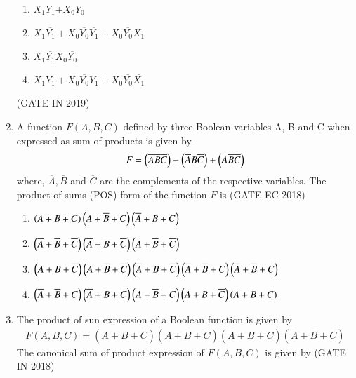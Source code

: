 \begin{enumerate}[label=\arabic*.,ref=\theenumi]
\begin{enumerate}
                        \item$X_1Y_1$+$X_0Y_0$
                        \item$X_1\overline{Y_1}+X_0\overline{Y_0}\overline{Y_1}+X_0\overline{Y_0}X_1$
                        \item$X_1\overline{Y_1}X_0\overline{Y_0}$
                        \item$X_1Y_1+X_0\overline{Y_0}Y_1+X_0\overline{Y_0}\overline{X_1}$
                  \end{enumerate}
            \hfill(GATE IN 2019)
%
\item
	\label{prob:2023-gate-ec-9}
	A function $F(A, B, C)$ defined by three Boolean variables A, B and C when expressed as sum of products is given by $$ F = \left(\overline{A}  \overline{B}  \overline{C}\right) + \left(\overline{A}  B  \overline{C}\right) + \left(A  \overline{B}  \overline{C}\right) $$
where, $\overline{A},\overline{B}$ and $\overline{C}$ are the complements of the respective variables. The product of sums (POS) form of the function $F$ is
\hfill(GATE EC 2018)
%
\begin{enumerate}
	\item $ \left(A+B+C\right)  \left(A+\overline{B}+C\right)  \left(\overline{A}+B+C\right) $
 	\item $ \left(\overline{A}+\overline{B}+\overline{C}\right)  \left(\overline{A}+B+\overline{C}\right)  \left(A+\overline{B}+\overline{C}\right) $
	\item $ \left(A+B+\overline{C}\right)  \left(A+\overline{B}+\overline{C}\right)  \left(\overline{A}+B+\overline{C}\right)  \left(\overline{A}+\overline{B}+C\right)  \left(\overline{A}+\overline{B}+C\right) $
	\item $ \left(\overline{A}+\overline{B}+C\right)  \left(\overline{A}+B+C\right)  \left(A+\overline{B}+C\right)  \left(A+B+\overline{C}\right)  \left(A+B+C\right) $
\end{enumerate}
\item
\label{prob:gate IN 43}
The product of sun expression of a Boolean function
                is given by 
                \begin{align}
			F(A,B,C)=(A+B+\overline{C})(A+\overline{B}+\overline{C})
			(\overline{A}+B+C)(\overline{A}+\overline{B}+\overline{C})
                \end{align}
                The canonical sum of product expression of $F(A,B,C)$ is given by 
		\hfill(GATE IN 2018)
                 \begin{enumerate}
 

\end{enumerate}
\end{enumerate}
